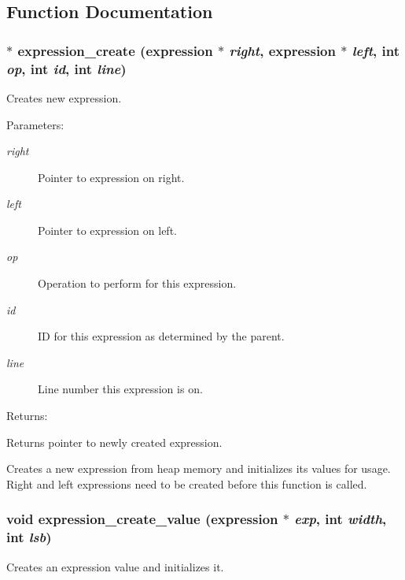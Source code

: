 \subsection{Function Documentation}
\subsubsection{$\ast$ expression\_\-create ({\bf expression} $\ast$ {\em right}, {\bf expression} $\ast$ {\em left}, int {\em op}, int {\em id}, int {\em line})}\label{expr_8h_a1}


Creates new expression.

\begin{Desc}
\item[Parameters: ]\par
\begin{description}
\item[{\em 
right}]Pointer to expression on right. \item[{\em 
left}]Pointer to expression on left. \item[{\em 
op}]Operation to perform for this expression. \item[{\em 
id}]ID for this expression as determined by the parent. \item[{\em 
line}]Line number this expression is on.\end{description}
\end{Desc}
\begin{Desc}
\item[Returns: ]\par
Returns pointer to newly created expression.\end{Desc}
Creates a new expression from heap memory and initializes its values for usage. Right and left expressions need to be created before this function is called. 
\subsubsection{\setlength{\rightskip}{0pt plus 5cm}void expression\_\-create\_\-value ({\bf expression} $\ast$ {\em exp}, int {\em width}, int {\em lsb})}\label{expr_8h_a0}


Creates an expression value and initializes it.


